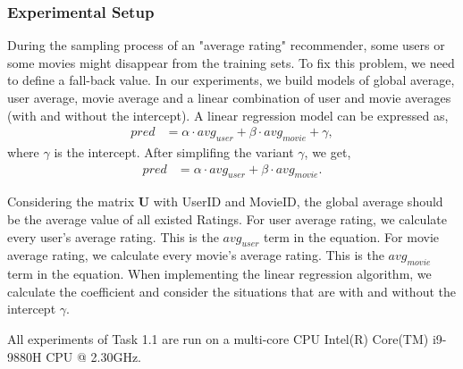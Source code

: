\documentclass[12pt]{article}
\begin{document}
\subsubsection{Experimental Setup}
During the sampling process of an "average rating" recommender, some users or some movies might disappear from the training sets. To fix this problem, we need to define a fall-back value. In our experiments, we build models of global average, user average, movie average and a linear combination of user and movie averages (with and without the intercept). A linear regression model can be expressed as,
\begin{align*}
    pred&=\alpha\cdot avg_{user} + \beta\cdot avg_{movie} + \gamma,
\end{align*}
where $\gamma$ is the intercept. After simplifing the variant $\gamma$, we get,
\begin{align*}
    pred&=\alpha\cdot avg_{user} + \beta\cdot avg_{movie}.
\end{align*}
\par
Considering the matrix $\mathbf{U}$ with UserID and MovieID, the global average should be the average value of all existed Ratings. For user average rating, we calculate every user's average rating. This is the $avg_{user}$ term in the equation. For movie average rating, we calculate every movie's average rating. This is the $avg_{movie}$ term in the equation. When implementing the linear regression algorithm, we calculate the coefficient and consider the situations that are with and without the intercept $\gamma$.\par
All experiments of Task 1.1 are run on a multi-core CPU Intel(R) Core(TM) i9-9880H CPU @ 2.30GHz.
\end{document}
